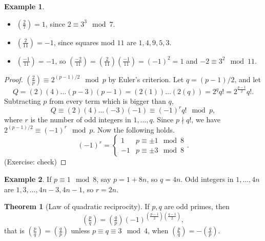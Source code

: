 \documentclass{article}
\newcommand{\rb}[1]{\left( #1 \right)}
\newcommand{\legendre}[2]{\rb{\tfrac{#1}{#2}}}
\theoremstyle{definition}\newtheorem{definition}{Definition}
\theoremstyle{definition}\newtheorem{remark}[definition]{Remark}
\theoremstyle{definition}\newtheorem*{example}{Example}
\theoremstyle{definition}\newtheorem*{note}{Note}
\newtheorem{theorem}[definition]{Theorem}
\begin{document}
\begin{example}
\hfill
\begin{itemize}
\item $ \legendre{2}{7} = 1 $, since $ 2 \equiv 3^3 \mod 7 $.
\item $ \legendre{2}{11} = -1 $, since squares mod $ 11 $ are $ 1, 4, 9, 5, 3 $.
\item $ \legendre{-1}{11} = -1 $, so $ \legendre{-2}{11} = \legendre{2}{11}\legendre{-1}{11} = \rb{-1}^2 = 1 $ and $ -2 \equiv 3^2 \mod 11 $.
\end{itemize}
\end{example}

\begin{proof}
$ \legendre{2}{p} \equiv 2^{\rb{p - 1} / 2} \mod p $ by Euler's criterion. Let $ q = \rb{p - 1} / 2 $, and let
$$ Q = \rb{2}\rb{4} \dots \rb{p - 3}\rb{p - 1} = \rb{2\rb{1}} \dots \rb{2\rb{q}} = 2^qq! = 2^{\tfrac{p - 1}{2}}q!. $$
Subtracting $ p $ from every term which is bigger than $ q $,
$$ Q \equiv \rb{2}\rb{4} \dots \rb{-3}\rb{-1} \equiv \rb{-1}^rq! \mod p, $$
where $ r $ is the number of odd integers in $ 1, \dots, q $. Since $ p \nmid q! $, we have $ 2^{\rb{p - 1} / 2} \equiv \rb{-1}^r \mod p $. Now the following holds.
$$ \rb{-1}^r = \begin{cases}
1 & p \equiv \pm 1 \mod 8 \\
-1 & p \equiv \pm 3 \mod 8
\end{cases}. $$
(Exercise: check)
\end{proof}

\begin{example}
If $ p \equiv 1 \mod 8 $, say $ p = 1 + 8n $, so $ q = 4n $. Odd integers in $ 1, \dots, 4n $ are $ 1, 3, \dots, 4n - 3, 4n - 1 $, so $ r = 2n $.
\end{example}

\begin{theorem}[Law of quadratic reciprocity]
\label{thm:40}
If $ p, q $ are odd primes, then
$$ \legendre{p}{q} = \legendre{q}{p}\rb{-1}^{\rb{\tfrac{p - 1}{2}}\rb{\tfrac{q - 1}{2}}}, $$
that is $ \legendre{p}{q} = \legendre{q}{p} $ unless $ p \equiv q \equiv 3 \mod 4 $, when $ \legendre{p}{q} = -\legendre{q}{p} $.
\end{theorem}
\end{document}
